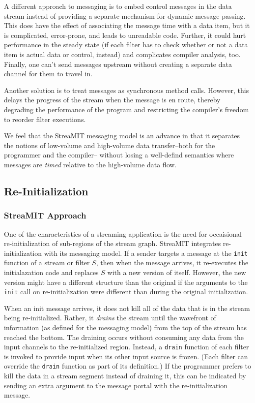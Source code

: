 A different approach to messaging is to embed control messages in the
data stream instead of providing a separate mechanism for dynamic
message passing.  This does have the effect of associating the message
time with a data item, but it is complicated, error-prone, and leads
to unreadable code.  Further, it could hurt performance in the steady
state (if each filter has to check whether or not a data item is
actual data or control, instead) and complicates compiler analysis,
too.  Finally, one can't send messages upstream without creating a
separate data channel for them to travel in.

Another solution is to treat messages as synchronous method calls.
However, this delays the progress of the stream when the message is en
route, thereby degrading the performance of the program and
restricting the compiler's freedom to reorder filter executions.  

We feel that the StreaMIT messaging model is an advance in that it
separates the notions of low-volume and high-volume data
transfer--both for the programmer and the compiler-- without losing a
well-defind semantics where messages are {\it timed} relative to the
high-volume data flow.

\subsection{Re-Initialization}

\subsubsection{StreaMIT Approach}

One of the characteristics of a streaming application is the need for
occaisional re-initialization of sub-regions of the stream graph.
StreaMIT integrates re-initialization with its messaging model.  If a
sender targets a message at the {\tt init} function of a stream or
filter $S$, then when the message arrives, it re-executes the
initialazation code and replaces $S$ with a new version of itself.
However, the new version might have a different structure than the
original if the arguments to the {\tt init} call on re-initialization
were different than during the original initialization.

When an init message arrives, it does not kill all of the data that is
in the stream being re-initialized.  Rather, it {\it drains} the
stream until the wavefront of information (as defined for the
messaging model) from the top of the stream has reached the bottom.
The draining occurs without consuming any data from the input channels
to the re-initialized region.  Instead, a {\tt drain} function of each
filter is invoked to provide input when its other input source is
frozen.  (Each filter can override the {\tt drain} function as part of
its definition.)  If the programmer prefers to kill the data in a
stream segment instead of draining it, this can be indicated by
sending an extra argument to the message portal with the
re-initialization message.


